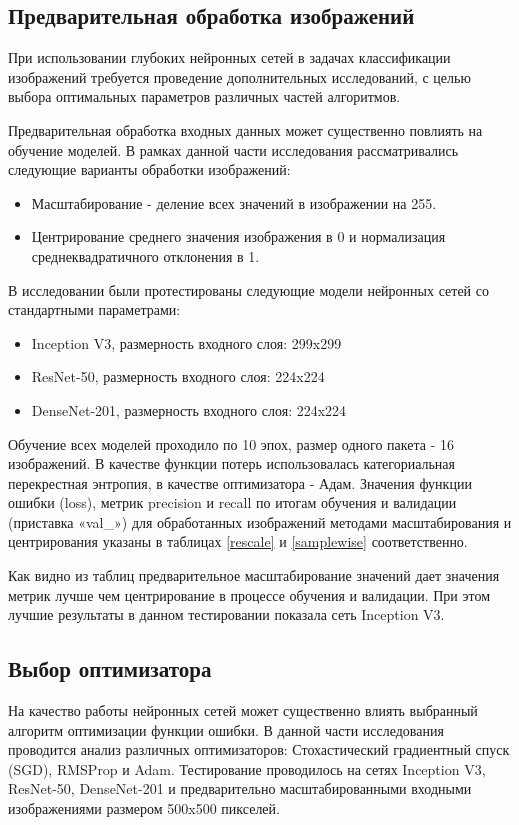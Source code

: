 \subsection{Предварительная обработка изображений}

При использовании глубоких нейронных сетей в задачах классификации изображений требуется проведение дополнительных исследований, с целью выбора оптимальных параметров различных частей алгоритмов. 

Предварительная обработка входных данных может существенно повлиять на обучение моделей. В рамках данной части исследования рассматривались следующие варианты обработки изображений:
\begin{itemize}    
    \item Масштабирование - деление всех значений в изображении на 255.
    \item Центрирование среднего значения изображения в 0 и нормализация среднеквадратичного отклонения в 1.
\end{itemize}
В исследовании были протестированы следующие модели нейронных сетей со стандартными параметрами:
\begin{itemize}
    \item Inception V3, размерность входного слоя: 299x299
    \item ResNet-50, размерность входного слоя: 224x224
    \item DenseNet-201, размерность входного слоя:  224x224
\end{itemize} 
Обучение всех моделей проходило по 10 эпох, размер одного пакета - 16 изображений. В качестве функции потерь использовалась категориальная перекрестная энтропия, в качестве оптимизатора - Адам. 
Значения функции ошибки (loss), метрик precision и recall  по итогам обучения и валидации (приставка «val\_») для обработанных изображений методами масштабирования и центрирования указаны в таблицах \ref{rescale} и \ref{samplewise} соответственно. 



Как видно из таблиц предварительное масштабирование значений дает значения метрик лучше чем центрирование в процессе обучения и валидации. При этом лучшие результаты в данном тестировании показала сеть Inception V3.

\subsection{Выбор оптимизатора}
На качество работы нейронных сетей может существенно влиять выбранный алгоритм оптимизации функции ошибки. В данной части исследования проводится анализ различных оптимизаторов: Стохастический градиентный спуск (SGD), RMSProp и Adam. Тестирование проводилось на сетях Inception V3, ResNet-50, DenseNet-201 и предварительно масштабированными входными изображениями размером 500x500 пикселей.  

